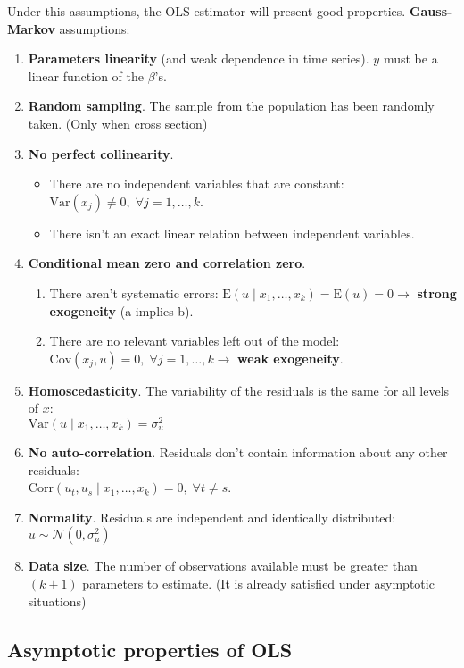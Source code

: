 \documentclass[10pt, a4paper, landscape]{extarticle}
\newcommand{\E}{\mathrm{E}}
\newcommand{\Var}{\mathrm{Var}}
\newcommand{\Cov}{\mathrm{Cov}}
\newcommand{\Corr}{\mathrm{Corr}}
\begin{document}
\begin{multicols}{3}
Under this assumptions, the OLS estimator will present good properties. \textbf{Gauss-Markov} assumptions:

\begin{enumerate}[leftmargin=*]
	\item \textbf{Parameters linearity} (and weak dependence in time series). $y$ must be a linear function of the $\beta$'s.
	\item \textbf{Random sampling}. The sample from the population has been randomly taken. (Only when cross section)
	\item \textbf{No perfect collinearity}.
	\begin{itemize}[leftmargin=*]
		\item There are no independent variables that are constant: $\Var(x_j) \neq 0, \; \forall j = 1, \ldots, k$.
		\item There isn't an exact linear relation between independent variables.
	\end{itemize}
	\item \textbf{Conditional mean zero and correlation zero}.
	\begin{enumerate}[leftmargin=*, label=\alph*.]
		\item There aren't systematic errors: $\E(u \mid x_1, \ldots, x_k) = \E(u) = 0 \rightarrow$ \textbf{strong exogeneity} (a implies b).
		\item There are no relevant variables left out of the model: $\Cov(x_j, u) = 0, \; \forall j = 1, \ldots, k \rightarrow$ \textbf{weak exogeneity}.
	\end{enumerate}
	\item \textbf{Homoscedasticity}. The variability of the residuals is the same for all levels of $x$: \\ $\Var(u \mid x_1, \ldots, x_k) = \sigma^2_u$
	\item \textbf{No auto-correlation}. Residuals don't contain information about any other residuals: \\ $\Corr(u_t, u_s \mid x_1, \ldots, x_k) = 0, \; \forall t \neq s$.
	\item \textbf{Normality}. Residuals are independent and identically distributed: $u \sim \mathcal{N} (0, \sigma^2_u)$
	\item \textbf{Data size}. The number of observations available must be greater than $(k + 1)$ parameters to estimate. (It is already satisfied under asymptotic situations)		
\end{enumerate}

\subsection*{Asymptotic properties of OLS}


\end{multicols}
\end{document}
